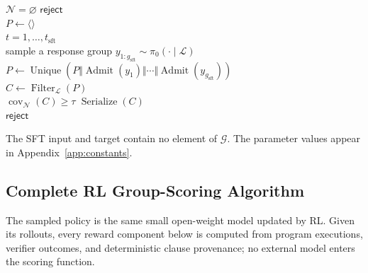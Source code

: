 \begin{algorithm}[H]
\caption{Multi-response SFT synthesis}
\label{alg:formal-sft}
\begin{algorithmic}
\algline {} \(\mathcal N=\varnothing\)  \(\mathsf{reject}\)\\
\algline \(P\leftarrow\langle\rangle\)\\
\algline {} \(t=1,\ldots,t_{\mathrm{sft}}\) \\
\algline \algind sample a response group \(y_{1:g_{\mathrm{sft}}}\sim\pi_0(\cdot\mid\mathcal L)\)\\
\algline \algind \(P\leftarrow\operatorname{Unique}(P\Vert
  \operatorname{Admit}(y_1)\Vert\cdots\Vert
  \operatorname{Admit}(y_{g_{\mathrm{sft}}}))\)\\
\algline \algind \(C\leftarrow\operatorname{Filter}_{\mathcal L}(P)\)\\
\algline \algind {} \(\operatorname{cov}_{\mathcal N}(C)\ge\tau\)
   \(\operatorname{Serialize}(C)\)\\
\algline {} \(\mathsf{reject}\)\\
\end{algorithmic}
\end{algorithm}

The SFT input and target contain no element of \(\mathcal G\).  The parameter
values appear in Appendix~\ref{app:constants}.

\subsection{Complete RL Group-Scoring Algorithm}

The sampled policy is the same small open-weight model updated by RL.  Given
its rollouts, every reward component below is computed from program
executions, verifier outcomes, and deterministic clause provenance; no
external model enters the scoring function.

